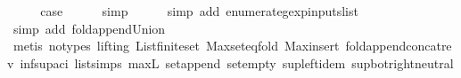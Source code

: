 \begin{isabellebody}
\ \ \isamarkupfalse%
\ \isamarkupfalse%
\ {\isacharquery}case\isanewline
\ \ \ \ \isamarkupfalse%
\ simp\isanewline
\ \ \ \ \isamarkupfalse%
\ {\isacharparenleft}simp\ add{\isacharcolon}\ enumerate{\isacharunderscore}gexp{\isacharunderscore}inputs{\isacharunderscore}list{\isacharparenright}\isanewline
\ \ \ \ \isamarkupfalse%
\ {\isacharparenleft}simp\ add{\isacharcolon}\ fold{\isacharunderscore}append{\isacharunderscore}Union{\isacharparenright}\isanewline
\ \ \ \ \isamarkupfalse%
\ {\isacharparenleft}metis\ {\isacharparenleft}no{\isacharunderscore}types{\isacharcomma}\ lifting{\isacharparenright}\ List{\isachardot}finite{\isacharunderscore}set\ Max{\isachardot}set{\isacharunderscore}eq{\isacharunderscore}fold\ Max{\isacharunderscore}insert\ fold{\isacharunderscore}append{\isacharunderscore}concat{\isacharunderscore}rev\ inf{\isacharunderscore}sup{\isacharunderscore}aci{\isacharparenleft}{}{\isacharparenright}\ list{\isachardot}simps{\isacharparenleft}{}{}{\isacharparenright}\ max{\isacharunderscore}{}L\ set{\isacharunderscore}append\ set{\isacharunderscore}empty\ sup{\isachardot}left{\isacharunderscore}idem\ sup{\isacharunderscore}bot{\isachardot}right{\isacharunderscore}neutral{\isacharparenright}\isanewline
{}\isamarkupfalse%
%
\endisatagproof
{\isafoldproof}%
%
\isadelimproof
\isanewline
%
\endisadelimproof
%
\isadelimtheory
\isanewline
%
\endisadelimtheory
%
\isatagtheory
{}\isamarkupfalse%
%
\endisatagtheory
{\isafoldtheory}%
%
\isadelimtheory
%
\endisadelimtheory
%
\end{isabellebody}%
\endinput
